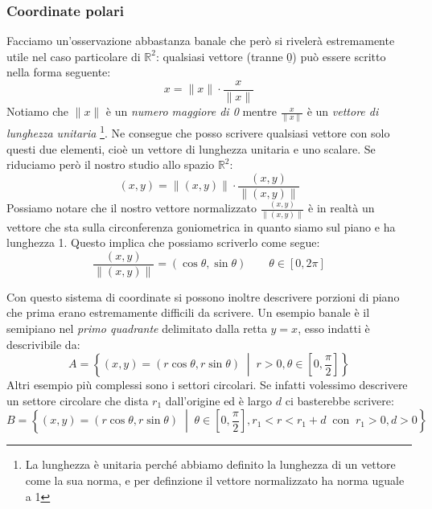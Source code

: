 \subsubsection{Coordinate polari} \label{sec_coordinatePolari}
Facciamo un'osservazione abbastanza banale che però si rivelerà estremamente 
utile nel caso particolare di $\mathbb{R}^2$: qualsiasi vettore (tranne 
$\underline{0}$) può essere scritto nella forma seguente:
\begin{equation*}
	x = \lVert x \rVert \cdot \dfrac{x}{\lVert x \rVert}
\end{equation*}
Notiamo che $\lVert x \rVert$ è un \textit{numero maggiore di 0} mentre 
$\frac{x}{\lVert x \rVert}$ è un \textit{vettore di lunghezza unitaria}
\footnote{La lunghezza è unitaria perché abbiamo definito la lunghezza di un 
vettore come la sua norma, e per definzione il vettore normalizzato ha norma 
uguale a 1}. Ne consegue che posso scrivere qualsiasi vettore con solo questi 
due elementi, cioè un vettore di lunghezza unitaria e uno scalare. Se riduciamo 
però il nostro studio allo spazio $\mathbb{R}^2$:
\begin{equation*}
	(x, y) = \lVert (x, y) \rVert \cdot \dfrac{(x, y)}{\lVert (x, y) \rVert}
\end{equation*}
Possiamo notare che il nostro vettore normalizzato $\frac{(x, y)}{\lVert (x, y) 
\rVert}$ è in realtà un vettore che sta sulla circonferenza goniometrica in 
quanto siamo sul piano e ha lunghezza 1. Questo implica che possiamo scriverlo 
come segue:
\begin{equation*}
	\dfrac{(x, y)}{\lVert (x, y) \rVert} = (\cos{\theta}, \sin{\theta}) \qquad 
    \theta \in [0, 2\pi]
\end{equation*}


Con questo sistema di coordinate si possono inoltre descrivere porzioni di 
piano che prima erano estremamente difficili da scrivere. Un esempio banale è 
il semipiano nel \textit{primo quadrante} delimitato dalla retta $y = x$, esso 
indatti è descrivibile da:
\begin{equation*}
	A = \left\{(x, y) = (r\cos{\theta}, r\sin{\theta}) \; \middle|\; r > 0, 
    \theta \in \left[0, \dfrac{\pi}{2} \right] \right\}
\end{equation*}
Altri esempio più complessi sono i settori circolari. Se infatti volessimo 
descrivere un settore circolare che dista $r_1$ dall'origine ed è largo $d$ 
ci basterebbe scrivere:
\begin{equation*}
	B = \left\{(x, y) = (r\cos{\theta}, r\sin{\theta}) \; \middle|\; \theta 
    \in \left[0, \dfrac{\pi}{2}\right], r_1 < r < r_1 + d \;\; \text{con}\;\; 
    r_1 > 0, d > 0 \right\}
\end{equation*}

